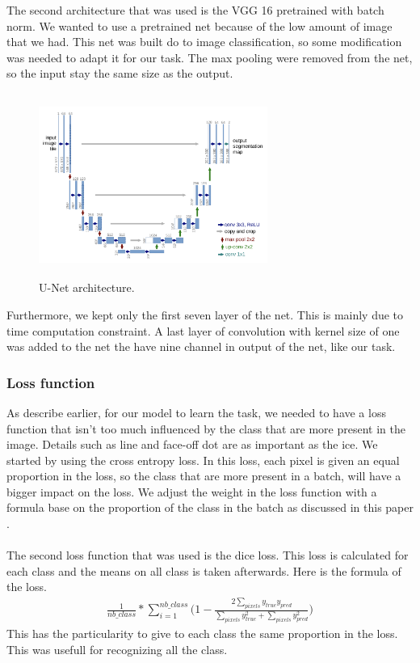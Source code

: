 The second architecture that was used is the VGG 16 pretrained with batch norm. We wanted to use a pretrained net because of the low amount of image that we had. This net was built do to image classification, so some modification was needed to adapt it for our task. The max pooling were removed from the net, so the input stay the same size as the output.
 
\begin{figure}[H]
	\centering
	\includegraphics[width=7.5cm,height=6cm]{figures/unet-architecture.png}
	\caption{U-Net architecture.}
	\label{fig:unet}
\end{figure}

Furthermore, we kept only the first seven layer of the net. This is mainly due to time computation constraint. A last layer of convolution with kernel size of one was added to the net the have nine channel in output of the net, like our task. 

\subsubsection{Loss function}
As describe earlier, for our model to learn the task, we needed to have a loss function that isn't too much influenced by the class that are more present in the image. Details such as line and face-off dot are as important as the ice. We started by using the cross entropy loss. In this loss, each pixel is given an equal proportion in the loss, so the class that are more present in a batch, will have a bigger impact on the loss. We adjust the weight in the loss function with a formula base on the proportion of the class in the batch as discussed in this paper \cite{Paszke}. \\
\\
The second loss function that was used is the dice loss. This loss is calculated for each class and the means on all class is taken afterwards. Here is the formula of the loss.
\begin{gather*}
 \frac{1}{nb\_class}*\sum\limits_{i=1}^{nb\_class}\Big(1-\frac{2\sum\limits_{pixels}y_{true}y_{pred}}{\sum\limits_{pixels}y_{true}^{2}+\sum\limits_{pixels}y_{pred}^{2}}\Big)
\end{gather*}
This has the particularity to give to each class the same proportion in the loss. This was usefull for recognizing all the class.

